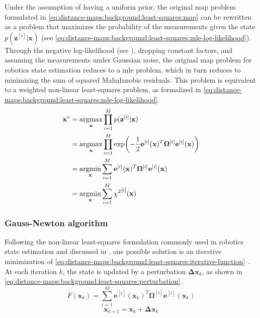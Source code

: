 Under the assumption of having a uniform prior,
the original \gls{map} problem formulated in
\eqref{eq:distance-maps:background:least-squares:map} can be rewritten as
a  problem that maximizes
the probability of the measurements given
the state $p(\mathbf{z}^{[i]}|\mathbf{x})$
(see \eqref{eq:distance-maps:background:least-squares:mle-log-likelihood}).
Through the negative log-likelihood
(see ), dropping constant factors,
and assuming the measurements under Gaussian noise,
the original \gls{map} problem for robotics state estimation reduces to a
\gls{mle} problem, which in turn reduces to minimizing
the sum of squared Mahalanobis residuals.
This problem is equivalent to a weighted non-linear least-squares problem,
as formalized in
\eqref{eq:distance-maps:background:least-squares:mle-log-likelihood}.
\begin{equation}\label{eq:distance-maps:background:least-squares:mle-log-likelihood}
\begin{aligned}
\mathbf{x}^*
  & = \operatorname*{argmax}_\mathbf{x} \prod_{i=1}^M p(\mathbf{z}^{[i]}|\mathbf{x})\\
  & = \operatorname*{argmax}_\mathbf{x} \prod_{i=1}^M \exp\!\left( -\frac{1}{2}\mathbf{e}^{[i]}(\mathbf{x})^T \mathbf{\Omega}^{[i]} \mathbf{e}^{[i]}(\mathbf{x}) \right)\\
  & = \operatorname*{argmin}_\mathbf{x} \sum_{i=1}^M \mathbf{e}^{[i]}(\mathbf{x})^T \mathbf{\Omega}^{[i]} \mathbf{e}^{[i]}(\mathbf{x})\\
  & = \operatorname*{argmin}_\mathbf{x} \sum_{i=1}^M {\chi^2}^{[i]}(\mathbf{x})
\end{aligned}
\end{equation}

\subsubsection{Gauss-Newton algorithm}
\label{sec:distance-maps:background:least-squares:gn}

Following the non-linear least-squares formulation commonly used in
robotics state estimation and discussed in
,
one possible solution is an iterative minimization of
\eqref{eq:distance-maps:background:least-squares:iterative-function}~\cite{grisetti:robotics:2020}.
At each iteration $k$, the state is updated by a
perturbation $\mathbf{\Delta x}_k$, as shown in
\eqref{eq:distance-maps:background:least-squares:perturbation}.
\begin{equation}\label{eq:distance-maps:background:least-squares:iterative-function}
F\!\left(\mathbf{x}_k\right) =
\sum_{i=1}^M \mathbf{e}^{[i]}\!\left(\mathbf{x}_k\right)^T
               \mathbf{\Omega}^{[i]}
               \mathbf{e}^{[i]}\!\left(\mathbf{x}_k\right)
\end{equation}
\begin{equation}\label{eq:distance-maps:background:least-squares:perturbation}
\mathbf{x}_{k+1} = \mathbf{x}_k + \mathbf{\Delta x}_k
\end{equation}

